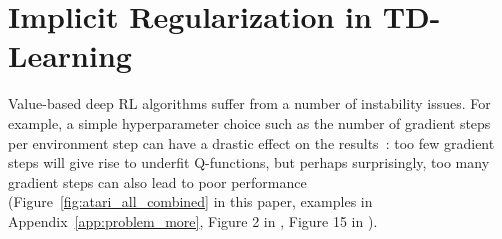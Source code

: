 \vspace{-7pt}
\section{Implicit Regularization in TD-Learning}
\vspace{-5pt}
\label{sec:problem}


Value-based deep RL algorithms suffer from a number of instability issues. For example, a simple hyperparameter choice such as the number of gradient steps per environment step can have a drastic effect on the results~\citep{fedus2020revisiting, fu2019diagnosing}: too few gradient steps will give rise to underfit Q-functions, but perhaps surprisingly, too many gradient steps can also lead to poor performance (Figure~\ref{fig:atari_all_combined} in this paper, examples in Appendix~\ref{app:problem_more}, Figure 2 in \citep{kumar2021implicit}, Figure 15 in \citep{fu2019diagnosing}).   

